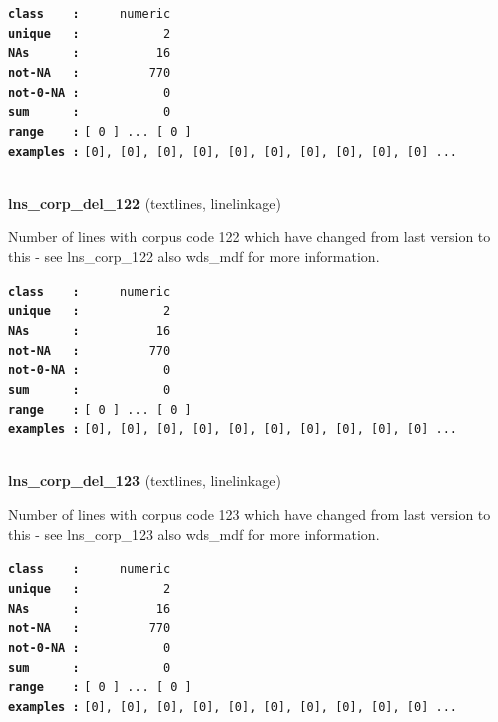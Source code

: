 \documentclass[]{article}
\begin{document}
\textbf{\texttt{class\ \ \ \ :}} \texttt{~~~~~numeric}\\
\textbf{\texttt{unique\ \ \ :}} \texttt{~~~~~~~~~~~2}\\
\textbf{\texttt{NAs\ \ \ \ \ \ :}} \texttt{~~~~~~~~~~16}\\
\textbf{\texttt{not-NA\ \ \ :}} \texttt{~~~~~~~~~770}\\
\textbf{\texttt{not-0-NA\ :}} \texttt{~~~~~~~~~~~0}\\
\textbf{\texttt{sum\ \ \ \ \ \ :}} \texttt{~~~~~~~~~~~0}\\
\textbf{\texttt{range\ \ \ \ :}}
\texttt{{[}\ 0\ {]}\ ...\ {[}\ 0\ {]}}\\
\textbf{\texttt{examples\ :}}
\texttt{{[}0{]},\ {[}0{]},\ {[}0{]},\ {[}0{]},\ {[}0{]},\ {[}0{]},\ {[}0{]},\ {[}0{]},\ {[}0{]},\ {[}0{]}\ ...}\\

~

\textbf{lns\_corp\_del\_122} (textlines, linelinkage)

Number of lines with corpus code 122 which have changed from last
version to this - see lns\_corp\_122 also wds\_mdf for more information.

\textbf{\texttt{class\ \ \ \ :}} \texttt{~~~~~numeric}\\
\textbf{\texttt{unique\ \ \ :}} \texttt{~~~~~~~~~~~2}\\
\textbf{\texttt{NAs\ \ \ \ \ \ :}} \texttt{~~~~~~~~~~16}\\
\textbf{\texttt{not-NA\ \ \ :}} \texttt{~~~~~~~~~770}\\
\textbf{\texttt{not-0-NA\ :}} \texttt{~~~~~~~~~~~0}\\
\textbf{\texttt{sum\ \ \ \ \ \ :}} \texttt{~~~~~~~~~~~0}\\
\textbf{\texttt{range\ \ \ \ :}}
\texttt{{[}\ 0\ {]}\ ...\ {[}\ 0\ {]}}\\
\textbf{\texttt{examples\ :}}
\texttt{{[}0{]},\ {[}0{]},\ {[}0{]},\ {[}0{]},\ {[}0{]},\ {[}0{]},\ {[}0{]},\ {[}0{]},\ {[}0{]},\ {[}0{]}\ ...}\\

~

\textbf{lns\_corp\_del\_123} (textlines, linelinkage)

Number of lines with corpus code 123 which have changed from last
version to this - see lns\_corp\_123 also wds\_mdf for more information.

\textbf{\texttt{class\ \ \ \ :}} \texttt{~~~~~numeric}\\
\textbf{\texttt{unique\ \ \ :}} \texttt{~~~~~~~~~~~2}\\
\textbf{\texttt{NAs\ \ \ \ \ \ :}} \texttt{~~~~~~~~~~16}\\
\textbf{\texttt{not-NA\ \ \ :}} \texttt{~~~~~~~~~770}\\
\textbf{\texttt{not-0-NA\ :}} \texttt{~~~~~~~~~~~0}\\
\textbf{\texttt{sum\ \ \ \ \ \ :}} \texttt{~~~~~~~~~~~0}\\
\textbf{\texttt{range\ \ \ \ :}}
\texttt{{[}\ 0\ {]}\ ...\ {[}\ 0\ {]}}\\
\textbf{\texttt{examples\ :}}
\texttt{{[}0{]},\ {[}0{]},\ {[}0{]},\ {[}0{]},\ {[}0{]},\ {[}0{]},\ {[}0{]},\ {[}0{]},\ {[}0{]},\ {[}0{]}\ ...}\\
\end{document}
